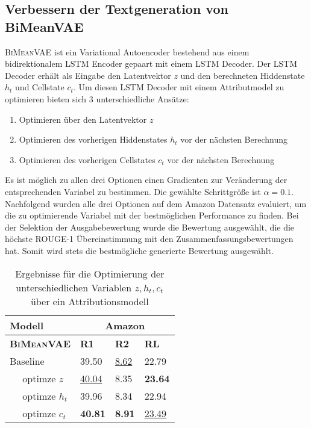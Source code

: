 

\subsection{Verbessern der Textgeneration von BiMeanVAE}
\textsc{BiMeanVAE} ist ein Variational Autoencoder bestehend aus einem bidirektionalem LSTM Encoder gepaart mit einem LSTM Decoder.
Der LSTM Decoder erhält als Eingabe den Latentvektor $z$ und den berechneten Hiddenstate $h_t$ und Cellstate $c_t$.
Um diesen LSTM Decoder mit einem Attributmodel zu optimieren bieten sich 3 unterschiedliche Ansätze:
\begin{enumerate}
    \item Optimieren über den Latentvektor $z$
    \item Optimieren des vorherigen Hiddenstates $h_t$ vor der nächsten Berechnung
    \item Optimieren des vorherigen Cellstates $c_t$ vor der nächsten Berechnung
\end{enumerate}

Es ist möglich zu allen drei Optionen einen Gradienten zur Veränderung der entsprechenden Variabel zu bestimmen. Die gewählte Schrittgröße ist $\alpha = 0.1$.
Nachfolgend wurden alle drei Optionen auf dem Amazon Datensatz evaluiert, um die zu optimierende Variabel mit der bestmöglichen Performance zu finden.
Bei der Selektion der Ausgabebewertung wurde die Bewertung ausgewählt, die die höchste ROUGE-1 Übereinstimmung mit den Zusammenfassungsbewertungen hat.
Somit wird stets die bestmögliche generierte Bewertung ausgewählt.

\begin{table}[h!]
    \centering
    \begin{tabular}{@{}llll@{}}
    \toprule
                    Modell   & \multicolumn{3}{c}{Amazon}              \\ \midrule
    \textbf{\textsc{BiMeanVAE}}    & \textbf{R1} & \textbf{R2} & \textbf{RL} \\ \midrule
    Baseline        & 39.50       & \underline{8.62}     &  22.79     \\
    $\quad$ optimze $z$        &   \underline{40.04}     &   8.35    &    \textbf{23.64}   \\
    $\quad$ optimze $h_t$      &  39.96   &    8.34  &  22.94  \\
    $\quad$ optimze $c_t$      &  \textbf{40.81}   &     \textbf{8.91}  &   \underline{23.49}    \\ \bottomrule
    \end{tabular}
    \caption{Ergebnisse für die Optimierung der unterschiedlichen Variablen $z,h_t,c_t$ über ein Attributionsmodell}
    \label{opt_bimeanvae}
\end{table}


